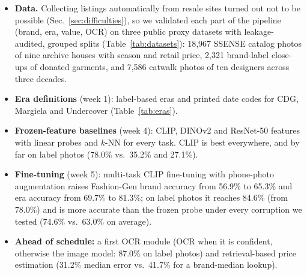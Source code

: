 \begin{itemize}\setlength\itemsep{1pt}\setlength\parskip{0pt}
\item \textbf{Data.} Collecting listings automatically from resale sites turned out not to be possible
(Sec.~\ref{sec:difficulties}), so we validated each part of the pipeline (brand, era, value, OCR) on three public proxy datasets
with leakage-audited, grouped splits (Table~\ref{tab:datasets}): 18,967 SSENSE catalog photos of nine
archive houses with season and retail price, 2,321 brand-label close-ups of donated garments, and
7,586 catwalk photos of ten designers across three decades.
\item \textbf{Era definitions} (week 1): label-based eras and printed date codes for CDG, Margiela
and Undercover (Table~\ref{tab:eras}).
\item \textbf{Frozen-feature baselines} (week 4): CLIP, DINOv2 and ResNet-50 features with linear
probes and $k$-NN for every task. CLIP is best everywhere, and by far on label photos (78.0\% vs.\
35.2\% and 27.1\%).
\item \textbf{Fine-tuning} (week 5): multi-task CLIP fine-tuning with phone-photo augmentation
raises Fashion-Gen brand accuracy from 56.9\% to 65.3\% and era accuracy from 69.7\% to 81.3\%;
on label photos it reaches 84.6\% (from 78.0\%) and is more accurate than the frozen probe under
every corruption we tested (74.6\% vs.\ 63.0\% on average).
\item \textbf{Ahead of schedule:} a first OCR module (OCR when it is confident, otherwise the image
model: 87.0\% on label photos) and retrieval-based price estimation (31.2\% median error vs.\
41.7\% for a brand-median lookup).
\end{itemize}
